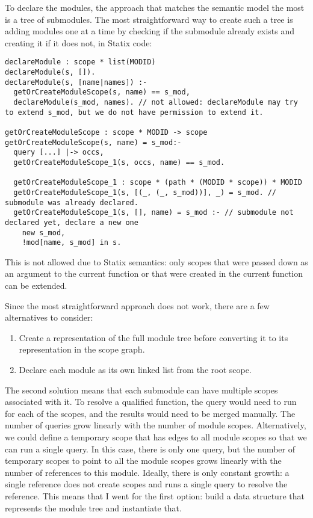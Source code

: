 To declare the modules, the approach that matches the semantic model the most is a tree of submodules.
The most straightforward way to create such a tree is adding modules one at a time by checking if the submodule already exists and creating it if it does not, in Statix code:
\begin{lstlisting}
declareModule : scope * list(MODID)
declareModule(s, []).
declareModule(s, [name|names]) :-
  getOrCreateModuleScope(s, name) == s_mod,
  declareModule(s_mod, names). // not allowed: declareModule may try to extend s_mod, but we do not have permission to extend it.

getOrCreateModuleScope : scope * MODID -> scope
getOrCreateModuleScope(s, name) = s_mod:-
  query [...] |-> occs,
  getOrCreateModuleScope_1(s, occs, name) == s_mod.

  getOrCreateModuleScope_1 : scope * (path * (MODID * scope)) * MODID
  getOrCreateModuleScope_1(s, [(_, (_, s_mod))], _) = s_mod. // submodule was already declared.
  getOrCreateModuleScope_1(s, [], name) = s_mod :- // submodule not declared yet, declare a new one
    new s_mod,
    !mod[name, s_mod] in s.
\end{lstlisting}
This is not allowed due to Statix semantics: only scopes that were passed down as an argument to the current function or that were created in the current function can be extended.

Since the most straightforward approach does not work, there are a few alternatives to consider:
\begin{enumerate}
  \item Create a representation of the full module tree before converting it to its representation in the scope graph.
  \item Declare each module as its own linked list from the root scope.
\end{enumerate}

The second solution means that each submodule can have multiple scopes associated with it.
To resolve a qualified function, the query would need to run for each of the scopes, and the results would need to be merged manually.
The number of queries grow linearly with the number of module scopes.
Alternatively, we could define a temporary scope that has  edges to all module scopes so that we can run a single query.
In this case, there is only one query, but the number of temporary scopes to point to all the module scopes grows linearly with the number of references to this module.
Ideally, there is only constant growth: a single reference does not create scopes and runs a single query to resolve the reference.
This means that I went for the first option: build a data structure that represents the module tree and instantiate that.

